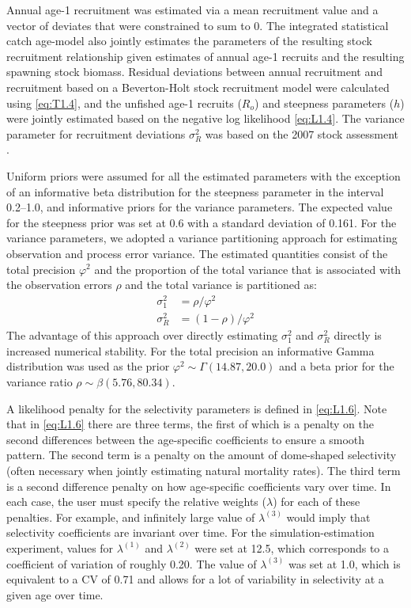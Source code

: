 Annual age-1 recruitment was estimated via a mean recruitment value and a vector of deviates that were constrained to sum to 0.  The integrated statistical catch age-model also jointly estimates the parameters of the resulting stock recruitment relationship given estimates of annual age-1 recruits and the resulting spawning stock biomass.  Residual deviations between annual recruitment and recruitment based on a Beverton-Holt stock recruitment model were calculated using \eqref{eq:T1.4}, and the unfished age-1 recruits ($R_o$) and steepness parameters ($h$) were jointly estimated based on the negative log likelihood \eqref{eq:L1.4}.  The variance parameter for recruitment deviations $\sigma_R^2$ was based on the 2007 stock assessment \citep{helser2007stock}.

Uniform priors were assumed for all the estimated parameters with the exception of an informative beta distribution for the steepness parameter in the interval 0.2--1.0, and informative priors for the variance parameters.  The expected value for the steepness prior was set at 0.6 with a standard deviation of 0.161.  For the variance parameters, we adopted a variance partitioning approach for estimating observation and process error variance. The estimated quantities consist of the total precision $\varphi^2$ and the proportion of the total variance that is associated with the observation errors $\rho$ and the total variance is partitioned as:  
\begin{align}
	\sigma^2_1 &= \rho/\varphi^2 \nonumber \\
	\sigma^2_R   &= (1-\rho)/\varphi^2 \label{eq:variance}
\end{align}
The advantage of this approach over directly estimating $\sigma_1^2$ and $\sigma_R^2$ directly is increased numerical stability.  For the total precision an informative Gamma distribution was used as the prior $\varphi^2 \sim \Gamma(14.87,20.0)$ and a beta prior for the variance ratio $\rho \sim \beta(5.76,80.34)$. 

A likelihood penalty for the selectivity parameters is defined in \eqref{eq:L1.6}.  Note that in \eqref{eq:L1.6} there are three terms, the first of which is a penalty on the second differences between the age-specific coefficients to ensure a smooth pattern.  The second term is a penalty on the amount of dome-shaped selectivity (often necessary when jointly estimating natural mortality rates).  The third term is a second difference penalty on how age-specific coefficients vary over time.  In each case, the user must specify the relative weights ($\lambda$) for each of these penalties.   For example, and infinitely large value of $\lambda^{(3)}$ would imply that selectivity coefficients are invariant over time.  For the simulation-estimation experiment, values for $\lambda^{(1)}$ and $\lambda^{(2)}$ were set at 12.5, which corresponds to a coefficient of variation of roughly 0.20.  The value of $\lambda^{(3)}$ was set at 1.0, which is equivalent to a CV of 0.71 and allows for a lot of variability in selectivity at a given age over time.



